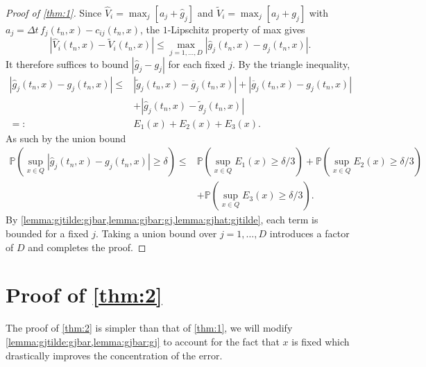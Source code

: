\documentclass[11pt,reqno,a4paper]{amsart}
\theoremstyle{definition}
\numberwithin{equation}{section}
\newcommand{\widebar}[1]{\overline{#1}}
\renewcommand{\P}{\mathbb{P}}
\DeclareMathOperator{\1}{\mathbbm{1}}
\begin{document}
\begin{proof}[Proof of \cref{thm:1}]
  Since $\widehat{V}_i = \max_j[a_j + \widehat{g}_j]$ and $\widetilde{V}_i = \max_j[a_j + g_j]$ with $a_j = \Delta t\, f_j(t_n,x) - c_{ij}(t_n,x)$, the $1$-Lipschitz property of max gives
  \begin{equation*}
    |\widehat{V}_i(t_n,x) - \widetilde{V}_i(t_n,x)| \leq \max_{j=1,\dots,D} |\widehat{g}_j(t_n,x) - g_j(t_n,x)|.
  \end{equation*}
  It therefore suffices to bound $|\widehat{g}_j - g_j|$ for each fixed $j$. By the triangle inequality,
  \begin{align*}
    |\widehat{g}_j(t_n,x) - g_j(t_n,x)|
    \leq &
    |\widetilde{g}_j(t_n,x) - \widebar{g}_j(t_n,x)|
    + |\widebar{g}_j(t_n,x) - g_j(t_n,x)|
    \\
         & + |\widehat{g}_j(t_n,x) - \widetilde{g}_j(t_n,x)|
    \\
    =:   &
    E_1(x) + E_2(x) + E_3(x).
  \end{align*}
  As such by the union bound
  \begin{align*}
    \P \left (\sup_{x \in Q} |\widehat{g}_j(t_n,x) - g_j(t_n,x)| \geq \delta \right )
    \leq &
    \P \left (\sup_{x \in Q} E_1(x) \geq \delta/3 \right )
    +
    \P \left (\sup_{x \in Q} E_2(x) \geq \delta/3 \right )
    \\
         & +
    \P \left (\sup_{x \in Q} E_3(x) \geq \delta/3 \right ).
  \end{align*}
  By \cref{lemma:gjtilde:gjbar,lemma:gjbar:gj,lemma:gjhat:gjtilde}, each term is bounded for a fixed $j$. Taking a union bound over $j = 1,\dots,D$ introduces a factor of $D$ and completes the proof.
\end{proof}

\section{Proof of \cref{thm:2}} \label{app:2}

The proof of \cref{thm:2} is simpler than that of \cref{thm:1}, we will modify \cref{lemma:gjtilde:gjbar,lemma:gjbar:gj} to account for the fact that $x$ is fixed which drastically improves the concentration of the error.
\end{document}
